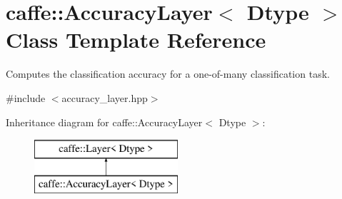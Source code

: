 \hypertarget{classcaffe_1_1AccuracyLayer}{}\section{caffe\+:\+:Accuracy\+Layer$<$ Dtype $>$ Class Template Reference}
\label{classcaffe_1_1AccuracyLayer}


Computes the classification accuracy for a one-\/of-\/many classification task.  




{\ttfamily \#include $<$accuracy\+\_\+layer.\+hpp$>$}

Inheritance diagram for caffe\+:\+:Accuracy\+Layer$<$ Dtype $>$\+:\begin{figure}[H]
\begin{center}
\leavevmode
\includegraphics[height=2.000000cm]{classcaffe_1_1AccuracyLayer}
\end{center}
\end{figure}
